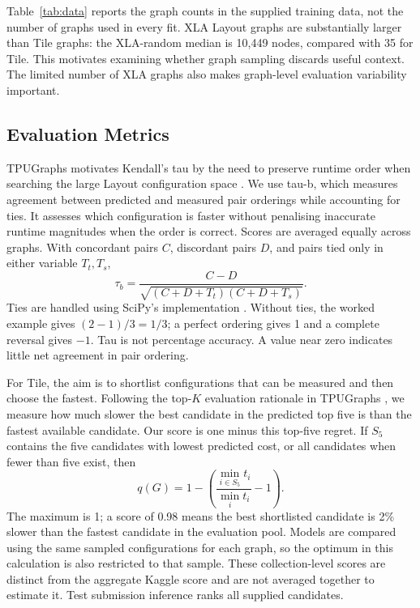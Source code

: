\documentclass[letterpaper]{article}
\begin{document}

Table~\ref{tab:data} reports the graph counts in the supplied training data, not the number of graphs used in every fit. XLA Layout graphs are substantially larger than Tile graphs: the XLA-random median is 10,449 nodes, compared with 35 for Tile. This motivates examining whether graph sampling discards useful context. The limited number of XLA graphs also makes graph-level evaluation variability important.

\subsection{Evaluation Metrics}
TPUGraphs motivates Kendall's tau by the need to preserve runtime order when searching the large Layout configuration space \citep{tpugraphs}. We use tau-b, which measures agreement between predicted and measured pair orderings while accounting for ties. It assesses which configuration is faster without penalising inaccurate runtime magnitudes when the order is correct. Scores are averaged equally across graphs. With concordant pairs $C$, discordant pairs $D$, and pairs tied only in either variable $T_t,T_s$,
\begin{equation}
\tau_b=\frac{C-D}{\sqrt{(C+D+T_t)(C+D+T_s)}}.
\end{equation}
Ties are handled using SciPy's implementation \citep{scipytau}. Without ties, the worked example gives $(2-1)/3=1/3$; a perfect ordering gives 1 and a complete reversal gives $-1$. Tau is not percentage accuracy. A value near zero indicates little net agreement in pair ordering.

For Tile, the aim is to shortlist configurations that can be measured and then choose the fastest. Following the top-$K$ evaluation rationale in TPUGraphs \citep{tpugraphs}, we measure how much slower the best candidate in the predicted top five is than the fastest available candidate. Our score is one minus this top-five regret. If $S_5$ contains the five candidates with lowest predicted cost, or all candidates when fewer than five exist, then
\begin{equation}
q(G)=1-\left(\frac{\min_{i\in S_5}t_i}{\min_i t_i}-1\right).
\end{equation}
The maximum is 1; a score of 0.98 means the best shortlisted candidate is 2\% slower than the fastest candidate in the evaluation pool. Models are compared using the same sampled configurations for each graph, so the optimum in this calculation is also restricted to that sample. These collection-level scores are distinct from the aggregate Kaggle score and are not averaged together to estimate it. Test submission inference ranks all supplied candidates.
\end{document}
